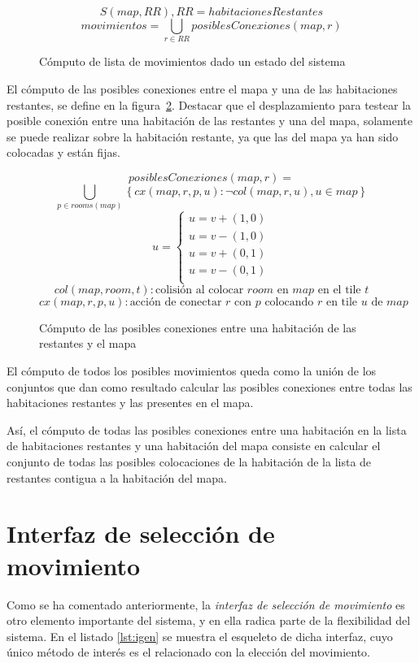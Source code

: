 \begin{figure}[h]
\centering
{
	$$S(map, RR), RR = habitacionesRestantes$$
	$$movimientos = \bigcup_{r \in RR}posiblesConexiones(map, r)$$
}
\caption{Cómputo de lista de movimientos dado un estado del sistema
\label{fig:posmovs}
}
\end{figure}

El cómputo de las posibles conexiones entre el mapa y una de las habitaciones restantes, se define en la figura~\ref{fig:poscons}. Destacar que el desplazamiento para testear la posible conexión entre una habitación de las restantes y una del mapa, solamente se puede realizar sobre la habitación restante, ya que las del mapa ya han sido colocadas y están fijas.

\begin{figure}[h]
	$$posiblesConexiones(map, r) = $$
	$$\bigcup_{p \in rooms(map)}  \left\{ cx(map,r,p,u) : \neg col(map, r, u), u \in map \right\}$$
	$$u = \begin{cases}
		u = v + (1,0) \\
		u = v - (1,0) \\
		u = v + (0,1) \\
		u = v - (0,1) \\
	\end{cases}$$
	$$col(map, room, t) : \text{colisión al colocar $room$ en $map$ en el tile $t$}$$
	$$cx(map,r,p,u) : \text{acción de conectar $r$ con $p$ colocando $r$ en tile $u$ de $map$}$$
\caption{Cómputo de las posibles conexiones entre una habitación de las restantes y el mapa
\label{fig:poscons}
}
\end{figure}

El cómputo de todos los posibles movimientos queda como la unión de los conjuntos que dan como resultado calcular las posibles conexiones entre todas las habitaciones restantes y las presentes en el mapa.

Así, el cómputo de todas las posibles conexiones entre una habitación en la lista de habitaciones restantes y una habitación del mapa consiste en calcular el conjunto de todas las posibles colocaciones de la habitación de la lista de restantes contigua a la habitación del mapa.


\section{Interfaz de selección de movimiento}

Como se ha comentado anteriormente, la \emph{interfaz de selección de movimiento} es otro elemento importante del sistema, y en ella radica parte de la flexibilidad del sistema. En el listado \ref{lst:igen} se muestra el esqueleto de dicha interfaz, cuyo único método de interés es el relacionado con la elección del movimiento.

